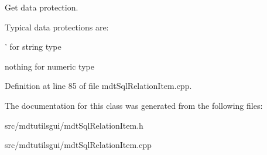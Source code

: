 Get data protection. 

Typical data protections are:
\begin{DoxyItemize}
\item ' for string type
\item nothing for numeric type 
\end{DoxyItemize}

Definition at line 85 of file mdtSqlRelationItem.cpp.



The documentation for this class was generated from the following files:\begin{DoxyCompactItemize}
\item 
src/mdtutilsgui/mdtSqlRelationItem.h\item 
src/mdtutilsgui/mdtSqlRelationItem.cpp\end{DoxyCompactItemize}
